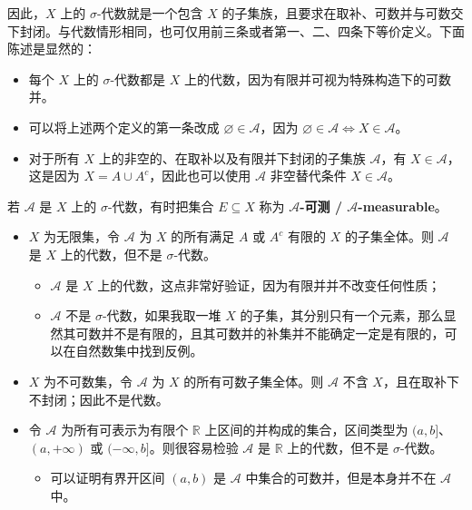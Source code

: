 \documentclass[11pt]{article}
\newcommand{\RR}{\mathbb{R}}
\newcommand{\calA}{\mathcal{A}}
\newcommand{\diam}{\varnothing}
\begin{document}
因此，$X$ 上的 $\sigma$-代数就是一个包含 $X$ 的子集族，且要求在取补、可数并与可数交下封闭。与代数情形相同，也可仅用前三条或者第一、二、四条下等价定义。下面陈述是显然的：
\begin{itemize}
    \item 每个 $X$ 上的 $\sigma$-代数都是 $X$ 上的代数，因为有限并可视为特殊构造下的可数并。
    \item 可以将上述两个定义的第一条改成 $\diam \in \calA$，因为 $\diam \in \calA \Longleftrightarrow X \in \calA$。
    \item 对于所有 $X$ 上的非空的、在取补以及有限并下封闭的子集族 $\calA$，有 $X \in \calA$，这是因为 $X = A \cup A^c$，因此也可以使用 $\calA$ 非空替代条件 $X \in \calA$。
\end{itemize}

若 $\calA$ 是 $X$ 上的 $\sigma$-代数，有时把集合 $E \subseteq X$ 称为 {\normalfont\bfseries $\calA$-可测 / $\calA$-measurable}。

\begin{example}
    \begin{itemize}
        \item $X$ 为无限集，令 $\calA$ 为 $X$ 的所有满足 $A$ 或 $A^c$ 有限的 $X$ 的子集全体。则 $\calA$ 是 $X$ 上的代数，但不是 $\sigma$-代数。
              \begin{itemize}
                  \item $\calA$ 是 $X$ 上的代数，这点非常好验证，因为有限并并不改变任何性质；
                  \item $\calA$ 不是 $\sigma$-代数，如果我取一堆 $X$ 的子集，其分别只有一个元素，那么显然其可数并不是有限的，且其可数并的补集并不能确定一定是有限的，可以在自然数集中找到反例。
              \end{itemize}
        \item $X$ 为不可数集，令 $\calA$ 为 $X$ 的所有可数子集全体。则 $\calA$ 不含 $X$，且在取补下不封闭；因此不是代数。
        \item 令 $\calA$ 为所有可表示为有限个 $\RR$ 上区间的并构成的集合，区间类型为 $(a,b]$、$(a,+\infty)$ 或 $(-\infty,b]$。则很容易检验 $\calA$ 是 $\RR$ 上的代数，但不是 $\sigma$-代数。
              \begin{itemize}
                  \item 可以证明有界开区间 $(a,b)$ 是 $\calA$ 中集合的可数并，但是本身并不在 $\calA$ 中。
              \end{itemize}
    \end{itemize}
\end{example}
\end{document}
